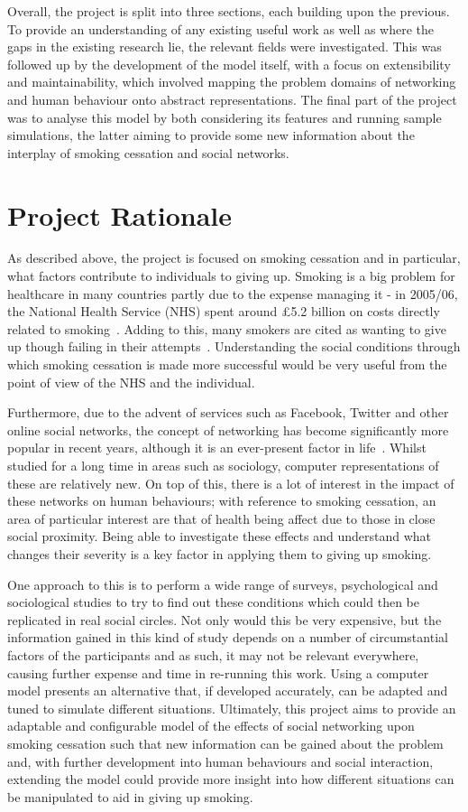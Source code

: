\documentclass[]{report}
\begin{document}
Overall, the project is split into three sections, each building upon the previous. To provide an understanding of any existing useful work as well as where the gaps in the existing research lie, the relevant fields were investigated. This was followed up by the development of the model itself, with a focus on extensibility and maintainability, which involved mapping the problem domains of networking and human behaviour onto abstract representations. The final part of the project was to analyse this model by both considering its features and running sample simulations, the latter aiming to provide some new information about the interplay of smoking cessation and social networks.

\section{Project Rationale}
As described above, the project is focused on smoking cessation and in particular, what factors contribute to individuals to giving up. Smoking is a big problem for healthcare in many countries partly due to the expense managing it - in 2005/06, the National Health Service (NHS) spent around \pounds5.2 billion on costs directly related to smoking~\cite{NHS-78}. Adding to this, many smokers are cited as wanting to give up though failing in their attempts~\cite{NHS-44}. Understanding the social conditions through which smoking cessation is made more successful would be very useful from the point of view of the NHS and the individual.

Furthermore, due to the advent of services such as Facebook, Twitter and other online social networks, the concept of networking has become significantly more popular in recent years, although it is an ever-present factor in life~\cite{USN-4}. Whilst studied for a long time in areas such as sociology, computer representations of these are relatively new. On top of this, there is a lot of interest in the impact of these networks on human behaviours; with reference to smoking cessation, an area of particular interest are that of health being affect due to those in close social proximity. Being able to investigate these effects and understand what changes their severity is a key factor in applying them to giving up smoking.

One approach to this is to perform a wide range of surveys, psychological and sociological studies to try to find out these conditions which could then be replicated in real social circles. Not only would this be very expensive, but the information gained in this kind of study depends on a number of circumstantial factors of the participants and as such, it may not be relevant everywhere, causing further expense and time in re-running this work. Using a computer model presents an alternative that, if developed accurately, can be adapted and tuned to simulate different situations. Ultimately, this project aims to provide an adaptable and configurable model of the effects of social networking upon smoking cessation such that new information can be gained about the problem and, with further development into human behaviours and social interaction, extending the model could provide more insight into how different situations can be manipulated to aid in giving up smoking.
\end{document}
